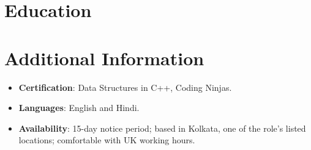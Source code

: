 \documentclass[11pt,a4paper,sans]{moderncv}
\begin{document}
\section{Education}
\vspace{1pt}


\section{Additional Information}
\vspace{1pt}
\begin{itemize}
\item {\textbf{Certification}: Data Structures in C++, Coding Ninjas.}
\item {\textbf{Languages}: English and Hindi.}
\item {\textbf{Availability}: 15-day notice period; based in Kolkata, one of the role's listed locations; comfortable with UK working hours.}
\end{itemize}
\end{document}

